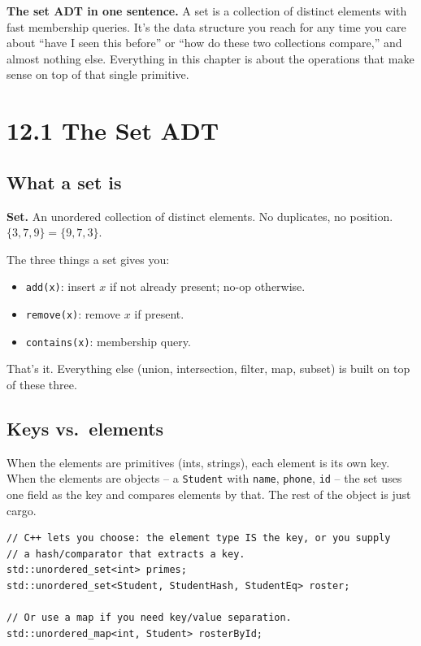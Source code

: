 \documentclass[11pt]{article}
\begin{document}
\begin{ideabox}
\textbf{The set ADT in one sentence.} A set is a collection of distinct elements with fast membership queries. It's the data structure you reach for any time you care about ``have I seen this before'' or ``how do these two collections compare,'' and almost nothing else. Everything in this chapter is about the operations that make sense on top of that single primitive.
\end{ideabox}

\section{12.1 The Set ADT}

\subsection*{What a set is}

\begin{defnbox}
\textbf{Set.} An unordered collection of distinct elements. No duplicates, no position. $\{3, 7, 9\} = \{9, 7, 3\}$.
\end{defnbox}

The three things a set gives you:
\begin{itemize}[leftmargin=*]
    \item \texttt{add(x)}: insert $x$ if not already present; no-op otherwise.
    \item \texttt{remove(x)}: remove $x$ if present.
    \item \texttt{contains(x)}: membership query.
\end{itemize}

That's it. Everything else (union, intersection, filter, map, subset) is built on top of these three.

\subsection*{Keys vs.\ elements}

When the elements are primitives (ints, strings), each element is its own key. When the elements are objects -- a \texttt{Student} with \texttt{name}, \texttt{phone}, \texttt{id} -- the set uses one field as the key and compares elements by that. The rest of the object is just cargo.

\begin{lstlisting}[basicstyle=\ttfamily\small,frame=single]
// C++ lets you choose: the element type IS the key, or you supply
// a hash/comparator that extracts a key.
std::unordered_set<int> primes;
std::unordered_set<Student, StudentHash, StudentEq> roster;

// Or use a map if you need key/value separation.
std::unordered_map<int, Student> rosterById;
\end{lstlisting}
\end{document}
